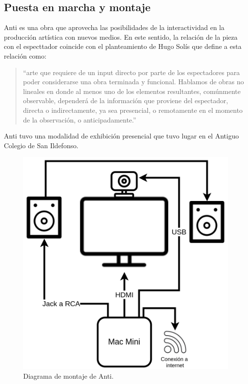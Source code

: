 \subsection{Puesta en marcha y montaje}

Anti es una obra que aprovecha las posibilidades de la interactividad en la producción artística con nuevos medios. En este sentido, la relación de la pieza con el especttador coincide con el planteamiento de Hugo Solís que define a esta relación como:

\begin{quote}

``arte que requiere de un input directo por parte de los espectadores para poder considerarse una obra terminada y funcional. Hablamos de obras no lineales en donde al menos uno de los elementos resultantes, comúnmente observable, dependerá de la información que proviene del espectador, directa o indirectamente, ya sea presencial, o remotamente en el momento de la observación, o anticipadamente.''\citep[p.~37]{hugoSolis}

\end{quote}
  
Anti tuvo una modalidad de exhibición presencial que tuvo lugar en el Antiguo Colegio de San Ildefonso.

\begin{figure}[tb]
\centering 
\includegraphics[width=0.7\columnwidth]{../../img/antiExWhite.png} 
\caption[Diagrama de Montaje Anti]{Diagrama de montaje de Anti.} %
\label{fig:gallery} 
\end{figure}


